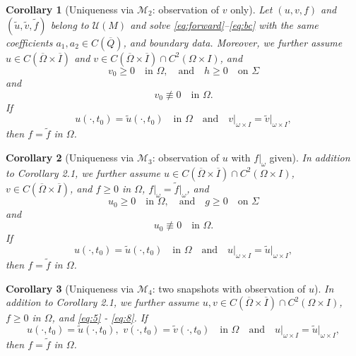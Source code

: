 \documentclass[12pt]{amsart}
\theoremstyle{plain}
\newtheorem{corollary}{Corollary}[section]
\theoremstyle{definition}
\theoremstyle{remark}
\newcommand{\ooo}{\overline}
\newcommand{\OOO}{\Omega}
\newcommand{\www}{\widetilde}
\begin{document}
\begin{corollary}[Uniqueness via $\mathcal{M}_2$: observation of $v$ only]
\label{cor:red2}
Let $(u,v,f)$ and $(\tilde u,\tilde v,\tilde f)$ belong to 
$\mathcal{U}(M)$ and solve \eqref{eq:forward}--\eqref{eq:bc} with the same coefficients $a_1, a_2 \in C(\ooo Q)$, and boundary data. Moreover, we further assume
$u \in C(\ooo\OOO \times \ooo{I})$ and 
$v \in C(\ooo\OOO \times \ooo{I}) \cap C^2(\OOO \times I)$,
and 
\begin{equation}
\label{eq:5}
v_0 \ge 0 \quad \text{in } \OOO, \quad \text{and}\quad
h \ge 0 \quad \text{on } \Sigma  
\end{equation}
and
\begin{equation}
\label{eq:6}
v_0 \not\equiv 0 \quad \text{in } \OOO. 
\end{equation}
If
$$
u(\cdot,t_0) = \www{u}(\cdot,t_0) \quad \mbox{in $\OOO$} \quad 
\mbox{and} \quad v\vert_{\omega \times I}= \www v\vert_{\omega \times I},
$$
then $f=\widetilde f$ in $\Omega$.
\end{corollary}

\begin{corollary}[Uniqueness via $\mathcal{M}_3$: observation of $u$ 
with $f|_\omega$ given]
\label{cor:red3}
In addition to Corollary 2.1, we further assume 
$u \in C(\ooo\OOO \times \ooo{I}) \cap C^2(\OOO \times I)$, 
$v \in C(\ooo\OOO \times \ooo{I})$, and $f \ge 0$ in $\OOO$, $f\vert_{\omega}
= \www f\vert_{\omega}$, and
\begin{equation}
\label{eq:7}
u_0 \ge 0 \quad \text{in } \OOO, \quad \text{and}\quad
g \ge 0 \quad \text{on } \Sigma  
\end{equation}
and
\begin{equation}
\label{eq:8}
u_0 \not\equiv 0 \quad \text{in }\OOO. 
\end{equation}
If
$$
u(\cdot,t_0) = \www{u}(\cdot,t_0) \quad \mbox{in $\OOO$} \quad 
\mbox{and} \quad u\vert_{\omega \times I}= \www u\vert_{\omega \times I},
$$
then $f=\widetilde f$ in $\Omega$.

\end{corollary}


\begin{corollary}[Uniqueness via $\mathcal{M}_4$: two snapshots with 
observation of $u$]
\label{cor:red4}
In addition to Corollary 2.1, we further assume 
$u, v \in C(\ooo\OOO \times \ooo{I}) \cap C^2(\OOO \times I)$,
$f \ge 0$ in $\OOO$, and  \eqref{eq:5} - \eqref{eq:8}.
If 
$$
u(\cdot,t_0) = \www{u}(\cdot,t_0),\,\, 
v(\cdot,t_0) = \www{v}(\cdot,t_0) \quad \mbox{in $\OOO$} \quad 
\mbox{and} \quad u\vert_{\omega \times I}= \www u\vert_{\omega \times I},
$$
then $f=\widetilde f$ in $\Omega$.
\end{corollary}
\end{document}
